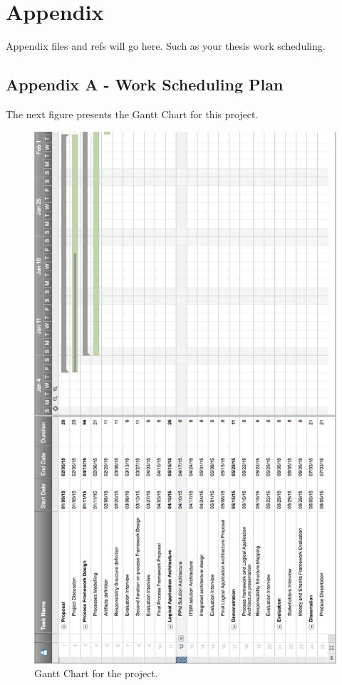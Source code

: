 
\section{Appendix} %
\label{sec:attachments}

Appendix files and refs will go here.
Such as your thesis work scheduling. 

\subsection{Appendix A - Work Scheduling Plan} 

The next figure presents the Gantt Chart for this project.

\begin{figure}[h!]
\centering
\includegraphics[height=0.8\textheight]{img/GanttChart.png}
\caption{Gantt Chart for the project.}
\end{figure}

